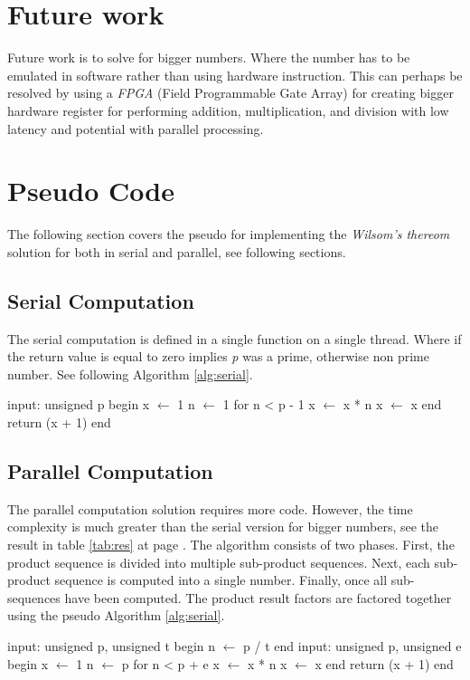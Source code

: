 \documentclass[12pt, oneside, onecolumn]{article}
\begin{document}

%
\section{Future work}
Future work is to solve for bigger numbers. Where the number has to be emulated in software rather than using hardware instruction. This can perhaps be resolved by using a \textit{FPGA} (Field Programmable Gate Array) for creating bigger hardware register for performing addition, multiplication, and division with low latency and potential with parallel processing.

\section{Pseudo Code}
The following section covers the pseudo for implementing the \emph{Wilsom's thereom} solution for both in serial and parallel, see following sections.

\subsection{Serial Computation}
The serial computation is defined in a single function on a single thread. Where if the return value is equal to zero implies \emph{p} was a prime, otherwise non prime number. See following Algorithm \ref{alg:serial}.
\begin{algorithm}[caption={Serial Computation.},label={alg:serial}]
input: unsigned p
begin
	x $\gets$ 1
	n $\gets$ 1
	for n < p - 1
		x $\gets$ x * n
		x $\gets$ x %
	end
	return (x + 1) %
end
\end{algorithm}

\subsection{Parallel Computation}
The parallel computation solution requires more code. However, the time complexity is much greater than the serial version for bigger numbers, see the result in table \ref{tab:res} at page \pageref{tab:res}.
The algorithm consists of two phases. First, the product sequence is divided into multiple sub-product sequences. Next, each sub-product sequence is computed into a single number. Finally, once all sub-sequences have been computed. The product result factors are factored together using the pseudo Algorithm \ref{alg:serial}.

\begin{algorithm}[caption={Wilsom's Prime - Parallel Computation.},label={alg:parallel}]
input: unsigned p, unsigned t
begin
	n $\gets$ p / t
end
input: unsigned p, unsigned e
begin
	x $\gets$ 1
	n $\gets$ p
	for n < p + e
		x $\gets$ x * n
		x $\gets$ x %
	end
	return (x + 1) %
end
\end{algorithm}



\end{document}
